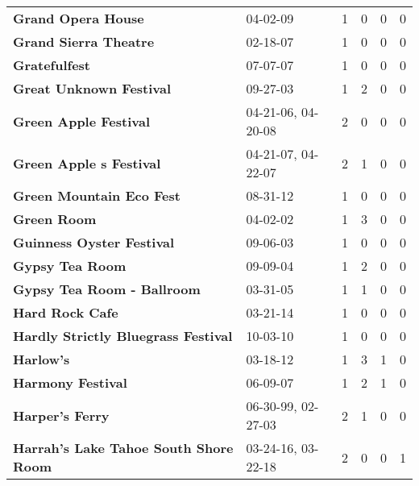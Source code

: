 \begin{supertabular}{p{0.4\textwidth}p{0.3\textwidth}p{0.05\textwidth}p{0.05\textwidth}p{0.05\textwidth}p{0.05\textwidth}}
                                           \textbf{Grand Opera House} &            04-02-09 &  1 &  0 &  0 &  0 \\
                                        \textbf{Grand Sierra Theatre} &            02-18-07 &  1 &  0 &  0 &  0 \\
                                                \textbf{Gratefulfest} &            07-07-07 &  1 &  0 &  0 &  0 \\
                                      \textbf{Great Unknown Festival} &            09-27-03 &  1 &  2 &  0 &  0 \\
                                        \textbf{Green Apple Festival} &  04-21-06, 04-20-08 &  2 &  0 &  0 &  0 \\
                                      \textbf{Green Apple s Festival} &  04-21-07, 04-22-07 &  2 &  1 &  0 &  0 \\
                                     \textbf{Green Mountain Eco Fest} &            08-31-12 &  1 &  0 &  0 &  0 \\
                                                  \textbf{Green Room} &            04-02-02 &  1 &  3 &  0 &  0 \\
                                    \textbf{Guinness Oyster Festival} &            09-06-03 &  1 &  0 &  0 &  0 \\
                                              \textbf{Gypsy Tea Room} &            09-09-04 &  1 &  2 &  0 &  0 \\
                                   \textbf{Gypsy Tea Room - Ballroom} &            03-31-05 &  1 &  1 &  0 &  0 \\
                                              \textbf{Hard Rock Cafe} &            03-21-14 &  1 &  0 &  0 &  0 \\
                          \textbf{Hardly Strictly Bluegrass Festival} &            10-03-10 &  1 &  0 &  0 &  0 \\
                                                    \textbf{Harlow's} &            03-18-12 &  1 &  3 &  1 &  0 \\
                                            \textbf{Harmony Festival} &            06-09-07 &  1 &  2 &  1 &  0 \\
                                              \textbf{Harper's Ferry} &  06-30-99, 02-27-03 &  2 &  1 &  0 &  0 \\
                        \textbf{Harrah’s Lake Tahoe South Shore Room} &  03-24-16, 03-22-18 &  2 &  0 &  0 &  1 \\

\end{supertabular}
